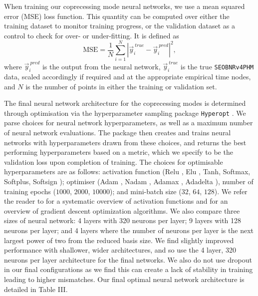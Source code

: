 \documentclass[prd,amssymb,amsmath,amsfonts,superscriptaddress,nofootinbib,reprint,showpacs, longbibliography]{revtex4-1}
\newcommand{\hyperopt}{\texttt{Hyperopt}{ }}
\newcommand{\SEOB}{\texttt{SEOBNRv4PHM}}
\begin{document}
When training our coprecessing mode neural networks, we use a mean squared error (MSE) loss function. This quantity can be computed over either the training dataset to monitor training progress, or the validation dataset as a control to check for over- or under-fitting. It is defined as 
\begin{equation}
    \textrm{MSE} = \frac{1}{N} \sum^{N}_{i=1} \left|\vec{y}^{~\textit{true}}_i - \vec{y}^{~\textit{pred}}_i\right|^2,
    \label{eq:MSE}
\end{equation}
where $\vec{y}_{i}^{~\textit{pred}}$ is the output from the neural network, $\vec{y}_{i}^{~\textit{true}}$ is the true \SEOB{} data, scaled accordingly if required and at the appropriate empirical time nodes, and $N$ is the number of points in either the training or validation set.

The final neural network architecture for the coprecessing modes is determined through optimisation via the hyperparameter sampling package \hyperopt \cite{Hyperopt:2013byc}. We parse choices for neural network hyperparameters, as well as a maximum number of neural network evaluations. The package then creates and trains neural networks with hyperparameters drawn from these choices, and returns the best performing hyperparameters based on a metric, which we specify to be the validation loss upon completion of training. The choices for optimisable hyperparameters are as follows: activation function (Relu \cite{fukushima1969visual,glorot2011deep}, Elu \cite{Clevert2015:elu}, Tanh, Softmax, Softplus, Softsign \cite{Elliott93abetter}); optimiser (Adam \cite{kingma2014adam}, Nadam \cite{dozat2016incorporating}, Adamax \cite{kingma2014adam}, Adadelta \cite{Zeiler:2012ad}), number of training epochs ($1000$, $2000$, $10000$); and mini-batch size ($32$, $64$, $128$). We refer the reader to \cite{Lederer2021:act} for a systematic overview of activation functions and \cite{Ruder2016:gdo} for an overview of gradient descent optimization algorithms. 
We also compare three sizes of neural network: 4 layers with 320 neurons per layer; 9 layers with 128 neurons per layer; and 4 layers where the number of neurons per layer is the next largest power of two from the reduced basis size. We find slightly improved performance with shallower, wider architectures, and so use the 4 layer, 320 neurons per layer architecture for the final networks. We also do not use dropout in our final configurations as we find this can create a lack of stability in training leading to higher mismatches. Our final optimal neural network architecture is detailed in Table III. 
\end{document}

